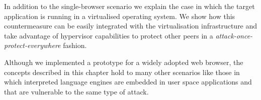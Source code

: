 In addition to the single-browser scenario we explain the case in which the target application is running in a virtualised operating system. We show how this countermeasure can be easily integrated with the virtualisation infrastructure and take advantage of hypervisor capabilities to protect other peers in a \emph{attack-once-protect-everywhere} fashion. 


Although we implemented a prototype for a widely adopted web browser, the concepts described in this chapter hold to many other scenarios like those in which interpreted language engines are embedded in user space applications and that are vulnerable to the same type of attack. 
